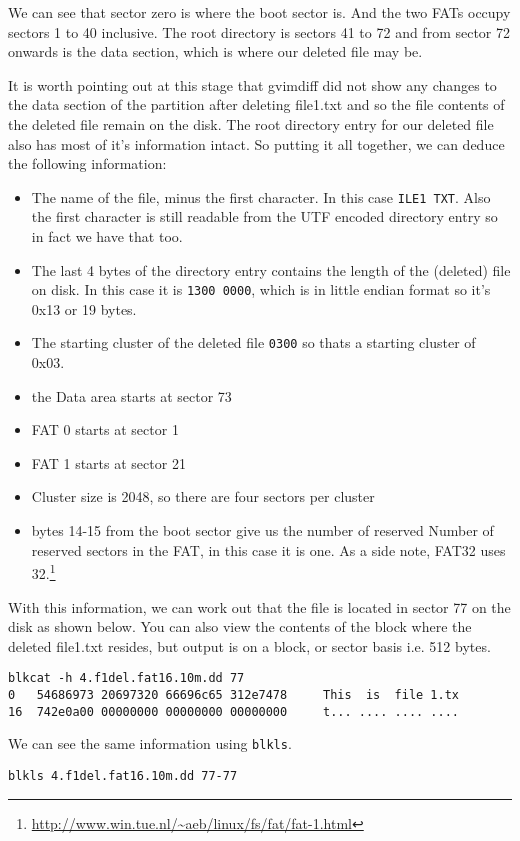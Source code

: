 \documentclass[a4paper,
    11pt,
    normalheadings,
    parindent,
    UKenglish,
    abstracton,
    ]{scrartcl}
\begin{document}
We can see that sector zero is where the boot sector is. And the two FATs occupy sectors 1 to 40 inclusive.
The root directory is sectors 41 to 72 and from sector 72 onwards is the data section, which is where our deleted file may be.

It is worth pointing out at this stage that gvimdiff did not show any changes to the data section of the partition after deleting file1.txt and so the file contents of the deleted file remain on the disk. The root directory entry for our deleted file also has most of it's information intact. So putting it all together, we can deduce the following information:

\begin{itemize}
	\item The name of the file, minus the first character. In this case \texttt{ILE1 TXT}. Also the first character is still readable from the UTF encoded directory entry so in fact we have that too.
	\item The last 4 bytes of the directory entry contains the length of the (deleted) file on disk. In this case it is \texttt{1300 0000}, which is in little endian format so it's 0x13 or 19 bytes.
	\item The starting cluster of the deleted file \texttt{0300} so thats a starting cluster of 0x03.
	\item the Data area starts at sector 73
	\item FAT 0 starts at sector 1
	\item FAT 1 starts at sector 21
	\item Cluster size is 2048, so there are four sectors per cluster
	\item bytes 14-15 from the boot sector give us the number of reserved Number of reserved sectors in the FAT, in this case it is one. As a side note, FAT32 uses 32.\footnote{\url{http://www.win.tue.nl/~aeb/linux/fs/fat/fat-1.html}}

\end{itemize}

With this information, we can work out that the file is located in sector 77 on the disk as shown below.
You can also view the contents of the block where the deleted file1.txt resides, but output is on a block, or sector basis i.e. 512 bytes.
\begin{verbatim}
blkcat -h 4.f1del.fat16.10m.dd 77
0	54686973 20697320 66696c65 312e7478 	This  is  file 1.tx 
16	742e0a00 00000000 00000000 00000000 	t... .... .... .... 
\end{verbatim}
We can see the same information using \texttt{blkls}.
\begin{verbatim}
blkls 4.f1del.fat16.10m.dd 77-77
\end{verbatim}
\end{document}
